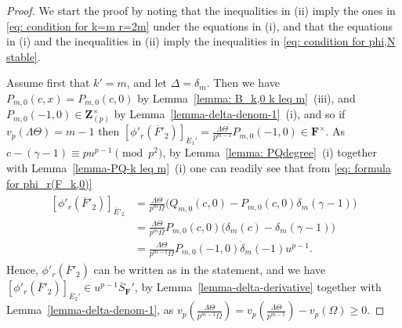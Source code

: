 \documentclass[11pt]{amsart}
\theoremstyle{definition}
\numberwithin{equation}{subsection}
\theoremstyle{plain}
\theoremstyle{plain}
\theoremstyle{plain}
\theoremstyle{plain}
\theoremstyle{plain}
\theoremstyle{plain}
\theoremstyle{plain}
\theoremstyle{plain}
\theoremstyle{plain}
\theoremstyle{plain}
\theoremstyle{plain}
\theoremstyle{plain}
\theoremstyle{definition}
\theoremstyle{definition}
\theoremstyle{definition}
\theoremstyle{remark}
\renewcommand{\(}{\textup{(}}
\renewcommand{\)}{\textup{)}}
\newcommand{\Z}{\mathbf{Z}}
\newcommand{\F}{\mathbf{F}}
\newcommand{\barS}{\overline{S}}
\newcommand{\barE}{\overline{E}}
\newcommand{\barF}{\overline{F}}
\begin{document}
\begin{proof}
We start the proof by noting that the inequalities in (ii) imply the ones in \eqref{eq: condition for k=m r=2m} under the equations in (i), and that the equations in (i) and the inequalities in (ii) imply the inequalities in \eqref{eq: condition for phi,N stable}.



Assume first that $k'=m$, and let $\Delta=\delta_m$. Then we have $P_{m,0}(c,x)=P_{m,0}(c,0)$ by Lemma~\ref{lemma: B_k,0 k leq m}~(iii), and $P_{m,0}(-1,0)\in\Z_{(p)}^{\times}$ by Lemma~\ref{lemma-delta-denom-1}~(i), and so if $v_p(\Lambda\Theta)=m-1$ then $[\phi'_r(\barF'_2)]_{\barE_1'}=\frac{\Lambda\Theta}{p^{m-1}}P_{m,0}(-1,0)\in\F^{\times}$. As $c-(\gamma-1)\equiv pu^{p-1}\pmod{p^2}$, by Lemma~\ref{lemma: PQdegree}~(i) together with Lemma~\ref{lemma-PQ-k leq m}~(i) one can readily see that from \eqref{eq: formula for phi_r(F_k,0)}
\begin{align}\label{eq: case k=m r=2m strong div, 1}
\begin{split}
[\phi'_r(\barF'_2)]_{\barE'_2}&= \frac{\Lambda\Theta}{p^m\Omega} \big(Q_{m,0}(c,0)-P_{m,0}(c,0)\delta_m(\gamma-1)\big)\\
&=\frac{\Lambda\Theta}{p^m\Omega} P_{m,0}(c,0)\big(\delta_m(c)-\delta_m(\gamma-1)\big)\\
&=\frac{\Lambda\Theta}{p^{m-1}\Omega} P_{m,0}(-1,0)\dot{\delta}_m(-1)u^{p-1}.
\end{split}
\end{align}
Hence, $\phi'_r(\barF'_2)$ can be written as in the statement, and we have $[\phi'_r(\barF'_2)]_{\barE_2'}\in u^{p-1}\barS_\F'$, by Lemma~\ref{lemma-delta-derivative} together with Lemma~\ref{lemma-delta-denom-1}, as $v_p(\frac{\Lambda\Theta}{p^{m-1}\Omega})=v_p(\frac{\Lambda\Theta}{p^{m-1}})-v_p(\Omega)\geq0$.




\end{proof}
\end{document}
